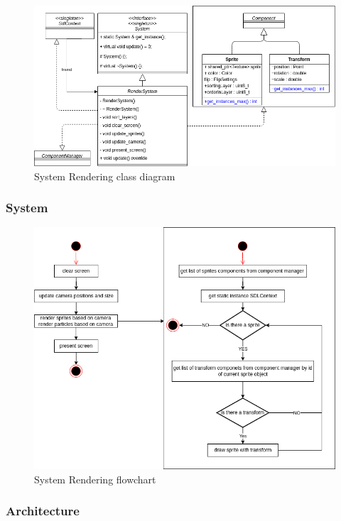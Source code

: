 \documentclass{projdoc}
\begin{document}
\begin{figure}
	\centering
	\includegraphics[width=\textwidth]{img/Rendering.png}
	\caption{System Rendering class diagram}
	\label{fig:class-rendering}
\end{figure}

\subsubsection{System}

\begin{figure}
	\centering
	\includegraphics[width=\textwidth]{img/flowchart_rendering.png}
	\caption{System Rendering flowchart }
	\label{fig:class-renderingflowchart}
\end{figure}

\subsubsection{Architecture}
\end{document}
